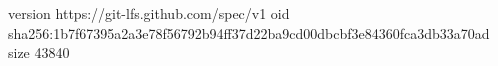 version https://git-lfs.github.com/spec/v1
oid sha256:1b7f67395a2a3e78f56792b94ff37d22ba9cd00dbcbf3e84360fca3db33a70ad
size 43840
